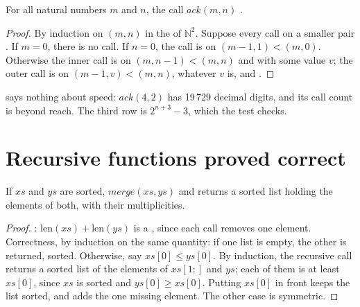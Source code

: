 \begin{proposition}\label{prop:b1:induction-and-termination:ackermann}
For all natural numbers $m$ and $n$, the call $\mathit{ack}(m, n)$ .
\end{proposition}

\begin{proof}
By  induction on $(m, n)$ in the  of $\mathbb{N}^2$. Suppose every call on a smaller
pair . If $m = 0$, there is no call. If $n = 0$, the call is on $(m - 1, 1) < (m, 0)$. Otherwise the inner call
is on $(m, n - 1) < (m, n)$ and  with some value $v$; the outer call is on $(m - 1, v) < (m, n)$, whatever
$v$ is, and .
\end{proof}

 says nothing about speed: $\mathit{ack}(4, 2)$ has 19\,729 decimal digits, and its call count is beyond
reach. The third row is $2^{n + 3} - 3$, which the test checks.

\section{Recursive functions proved correct}\label{sec:b1:induction-and-termination:recursion}

\label{lst:b1:induction-and-termination:merge}

\label{out:b1:induction-and-termination:merge}

\begin{proposition}\label{prop:b1:induction-and-termination:merge}
If $xs$ and $ys$ are sorted, $\mathit{merge}(xs, ys)$  and returns a sorted list holding the elements of
both, with their multiplicities.
\end{proposition}

\begin{proof}
: $\text{len}(xs) + \text{len}(ys)$ is a , since each call removes one element. Correctness, by
induction on the same quantity: if one list is empty, the other is returned, sorted. Otherwise, say $xs[0] \leq
ys[0]$. By induction, the recursive call returns a sorted list of the elements of $xs[1{:}]$ and $ys$; each of them is
at least $xs[0]$, since $xs$ is sorted and $ys[0] \geq xs[0]$. Putting $xs[0]$ in front keeps the list sorted, and adds
the one missing element. The other case is symmetric.
\end{proof}

